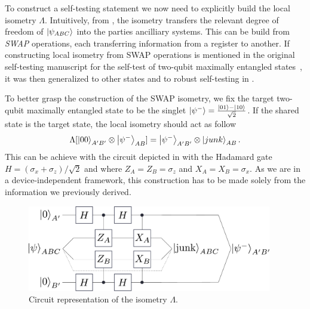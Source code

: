 \medbreak

To construct a self-testing statement we now need to explicitly build the local isometry $\Lambda$. 
Intuitively, from , the isometry transfers the relevant degree of freedom of $\ket{\psi_{ABC}}$ into the parties ancilliary systems.
This can be build from \textit{SWAP} operations, each transferring information from a register to another.
If constructing local isometry from SWAP operations is mentioned in the original self-testing manuscript for the self-test of two-qubit maximally entangled states~\cite{Mayers2004}, it was then generalized to other states and to robust self-testing in \cite{McKague2012,Yang2014,Bancal15}. 

To better grasp the construction of the SWAP isometry, we fix the target two-qubit maximally entangled state to be the singlet $\ket{\psi^-}=\frac{\ket{01}-\ket{10}}{\sqrt{2}}$.
If the shared state is the target state, the local isometry should act as follow
\begin{equation}
	\Lambda[\ket{00}_{A'B'} \otimes \ket{\psi^-}_{AB}] = \ket{\psi^-}_{A'B'} \otimes \ket{junk}_{AB}.
\end{equation}
This can be achieve with the circuit depicted in  with the Hadamard gate $H=(\sigma_x+\sigma_z)/\sqrt{2}$ and where $Z_A=Z_B=\sigma_z$ and $X_A=X_B=\sigma_x$.
As we are in a device-independent framework, this construction has to be made solely from the information we previously derived.

\begin{figure}
	\begin{center}
		\includegraphics[width=0.95\textwidth]{chapters/selftesting/img/swap.pdf}
	\end{center}
	\caption{Circuit representation of the isometry $\Lambda$.}
	\label{fig:swap}
\end{figure}

